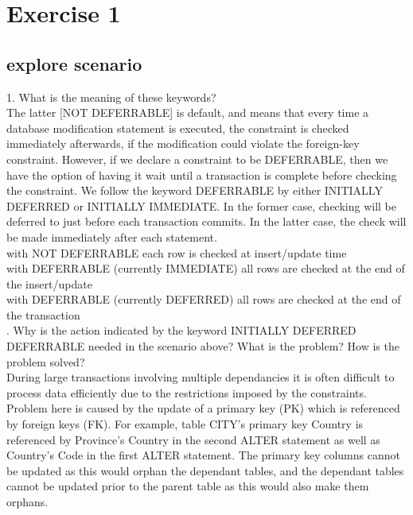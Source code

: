 \documentclass[]{article}
\title{}
\author{}
\date{}
\begin{document}
	
	
	
	\section{Exercise 1}
	
	\subsection{explore scenario}
	
	1. What is the meaning of these keywords?  \\
	
	\noindent The latter [NOT DEFERRABLE] is default, and means that every time a database modification statement is executed, the constraint is checked immediately afterwards, if the modification could violate the foreign-key constraint. However, if we declare a constraint to be DEFERRABLE, then we have the option of having it wait until a transaction is complete before checking the constraint. We follow the keyword DEFERRABLE by either INITIALLY DEFERRED or INITIALLY IMMEDIATE. In the former case, checking will be deferred to just before each transaction commits. In the latter case, the check will be made immediately after each statement.  \\
	
	\noindent with NOT DEFERRABLE each row is checked at insert/update time  \\
	
	\noindent with DEFERRABLE (currently IMMEDIATE) all rows are checked at the end of the insert/update  \\
	
	\noindent with DEFERRABLE (currently DEFERRED) all rows are checked at the end of the transaction   \\
	
	. Why is the action indicated by the keyword INITIALLY DEFERRED DEFERRABLE needed in the scenario above? What is the problem? How is the problem solved?  \\
	
	\noindent During large transactions involving multiple dependancies it is often difficult to process data efficiently due to the restrictions imposed by the constraints. Problem here is caused by the update of a primary key (PK) which is referenced by foreign keys (FK). For example, table CITY's primary key Country is referenced by Province's Country in the second ALTER statement as well as Country's Code in the first ALTER statement. The primary key columns cannot be updated as this would orphan the dependant tables, and the dependant tables cannot be updated prior to the parent table as this would also make them orphans.   \\
	
\end{document}
